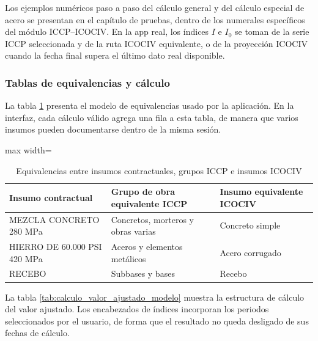 \documentclass[12pt,letterpaper]{article}
\newcommand{\ICOCIV}{ICOCIV}
\newcommand{\ICCP}{ICCP}
\begin{document}
Los ejemplos numéricos paso a paso del cálculo general y del cálculo especial de acero se presentan en el capítulo de pruebas, dentro de los numerales específicos del módulo \ICCP--\ICOCIV. En la app real, los índices \(I\) e \(I_0\) se toman de la serie \ICCP{} seleccionada y de la ruta \ICOCIV{} equivalente, o de la proyección \ICOCIV{} cuando la fecha final supera el último dato real disponible.

\subsubsection{Tablas de equivalencias y cálculo}

La tabla \ref{tab:equivalencias_modelo} presenta el modelo de equivalencias usado por la aplicación. En la interfaz, cada cálculo válido agrega una fila a esta tabla, de manera que varios insumos pueden documentarse dentro de la misma sesión.

\begin{table}[H]
\centering
\caption{Equivalencias entre insumos contractuales, grupos ICCP e insumos ICOCIV}
\label{tab:equivalencias_modelo}
\vspace{\baselineskip}
\scriptsize
\begin{adjustbox}{max width=\textwidth}
\begin{tabular}{lll}
\toprule
\textbf{Insumo contractual} & \textbf{Grupo de obra equivalente ICCP} & \textbf{Insumo equivalente ICOCIV} \\
\midrule
MEZCLA CONCRETO 280 MPa & Concretos, morteros y obras varias & Concreto simple \\
HIERRO DE 60.000 PSI 420 MPa & Aceros y elementos metálicos & Acero corrugado \\
RECEBO & Subbases y bases & Recebo \\
\bottomrule
\end{tabular}
\end{adjustbox}
\end{table}

La tabla \ref{tab:calculo_valor_ajustado_modelo} muestra la estructura de cálculo del valor ajustado. Los encabezados de índices incorporan los periodos seleccionados por el usuario, de forma que el resultado no queda desligado de sus fechas de cálculo.
\end{document}

